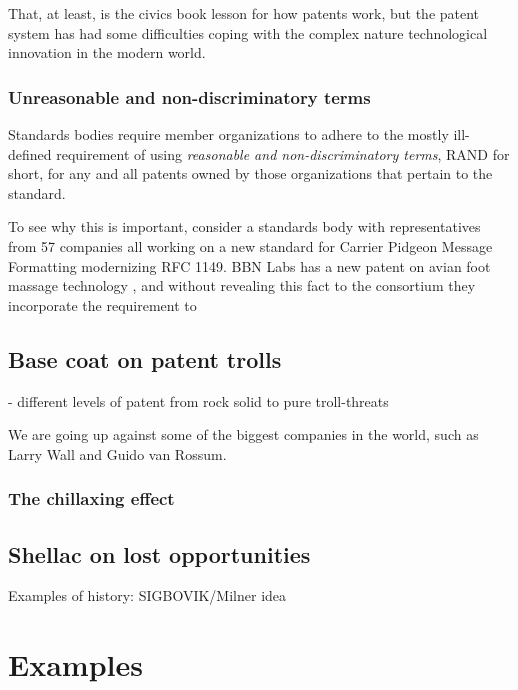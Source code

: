 \documentclass[acmtocl]%
{boviktrans}
\begin{document}
That, at least, is the civics book lesson for how patents work, but the
patent system has had some difficulties coping with the complex nature
technological innovation in the modern world. 

\subsubsection{Unreasonable and non-discriminatory terms}

Standards bodies require member organizations to adhere to the mostly
ill-defined requirement of using {\it reasonable and
  non-discriminatory terms}, RAND for short, for any and all patents
owned by those organizations that pertain to the standard.

To see why this is important, consider a standards body with
representatives from 57 companies all working on a new standard for
Carrier Pidgeon Message Formatting modernizing RFC 1149. BBN Labs has
a new patent on avian foot massage technology \cite{ebert}, and without
revealing this fact to the consortium they incorporate the requirement
to 

\subsection{Base coat on patent trolls}

- different levels of patent from rock solid to pure troll-threats

We are going up against some of the biggest companies in the world, such as Larry Wall and Guido van Rossum.

\subsubsection{The chillaxing effect}

\subsection{Shellac on lost opportunities}


Examples of history: SIGBOVIK/Milner idea


\section{Examples}
\end{document}
